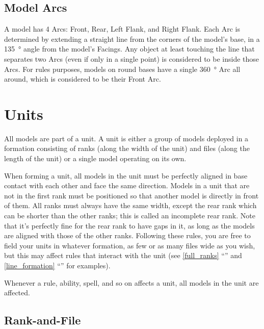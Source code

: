 \newpage
\subsection{Model Arcs}
\label{model_arcs}

A model has 4 Arcs: Front, Rear, Left Flank, and Right Flank. Each Arc is determined by extending a straight line from the corners of the model's base, in a \SI{135}{\degree} angle from the model's Facings. Any object at least touching the line that separates two Arcs (even if only in a single point) is considered to be inside those Arcs. For rules purposes, models on round bases have a single \SI{360}{\degree} Arc all around, which is considered to be their Front Arc.

\section{Units}
\label{units}

All models are part of a unit. A unit is either a group of models deployed in a formation consisting of ranks (along the width of the unit) and files (along the length of the unit) or a single model operating on its own.

When forming a unit, all models in the unit must be perfectly aligned in base contact with each other and face the same direction. Models in a unit that are not in the first rank must be positioned so that another model is directly in front of them. All ranks must always have the same width, except the rear rank which can be shorter than the other ranks; this is called an incomplete rear rank. Note that it's perfectly fine for the rear rank to have gaps in it, as long as the models are aligned with those of the other ranks. Following these rules, you are free to field your units in whatever formation, as few or as many files wide as you wish, but this may affect rules that interact with the unit (see \ref{full_ranks} \enquote{} and \ref{line_formation} \enquote{} for examples).

Whenever a rule, ability, spell, and so on affects a unit, all models in the unit are affected.

\subsection{Rank-and-File}
\label{rank_and_file}

